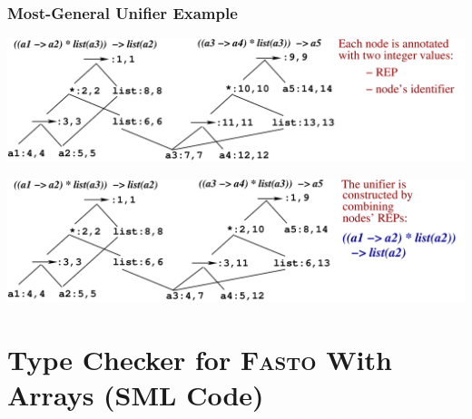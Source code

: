 \documentclass{beamer}
\begin{document}
\begin{frame}[fragile,t]
   \frametitle{Most-General Unifier Example}

\bigskip

\includegraphics[width=70ex]{Figures/Unification}\\

\bigskip

\includegraphics[width=70ex]{Figures/UnificationDone}

\end{frame}
\section{Type Checker for \textsc{Fasto} With Arrays (SML Code)}

\begin{frame}[fragile]
	\tableofcontents[currentsection]
\end{frame}
\end{document}
